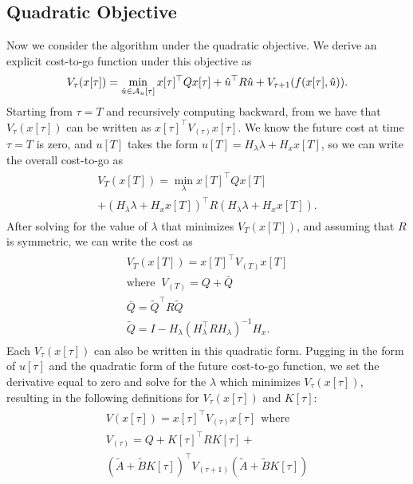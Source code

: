 \subsection{Quadratic Objective}
Now we consider the algorithm under the quadratic objective. We derive an explicit cost-to-go function under 
this objective as
\begin{align*}
V_{\tau}(x[\tau]) = \min\limits_{\hat{u} \in \mathcal{A}_u[\tau]} x[\tau]^\top  Q x[\tau] + \hat{u}^\top  R \hat{u} + V_{\tau+1}(f(x[\tau],\hat{u})).
\end{align*}
Starting from $\tau = T$ and recursively computing backward, from \cite{tseng2020system} we have that $V_{\tau}(x[\tau])$ can be written as $x[\tau]^\top  V_{(\tau)} x[\tau]$.
We know the future cost at time $\tau=T$ is zero, and $u[T]$ takes the form $u[T]=H_{\lambda}\lambda + H_x x[T]$, so we can write the overall cost-to-go as 
\begin{align*}
    \begin{gathered}
        V_{T}(x[T])
        = \min\limits_{\lambda} x[T]^\top  Q x[T] \\
        + (H_{\lambda}\lambda + H_x x[T])^\top  R (H_{\lambda}\lambda + H_x x[T]).
    \end{gathered}
\end{align*}
After solving for the value of $\lambda$ that minimizes $V_T(x[T])$, and assuming that $R$ is symmetric, we can write the cost as
\begin{align*}
    \begin{gathered}
        V_T(x[T]) = x[T]^\top  V_{(T)} x[T] \\
        \text{where }\ V_{(T)}= Q + \bar{Q} \\
        \bar{Q} = \tilde{Q}^\top  R \tilde{Q} \\
        \tilde{Q} = I-H_{\lambda}(H_{\lambda}^\top RH_{\lambda})^{-1}H_x.
    \end{gathered}
\end{align*}
Each $V_{\tau}(x[\tau])$ can also be written in this quadratic form. Pugging in the form of $u[\tau]$ and the 
quadratic form of the future cost-to-go function, we set the derivative equal to zero and solve for 
the $\lambda$ which minimizes $V_\tau(x[\tau])$, resulting in the following definitions for 
$V_{\tau}(x[\tau])$ and $K[\tau]$:
\begin{align}\label{eqn:V_LQ}
    \begin{gathered}
        V(x[\tau]) = x[\tau]^\top  V_{(\tau)} x[\tau]\ \ \text{where }\\
        V_{(\tau)} = Q + K[\tau]^\top  R K[\tau] + \\
        (\tilde{A}+\tilde{B}K[\tau])^\top  V_{(\tau+1)}(\tilde{A}+\tilde{B}K[\tau])
    \end{gathered}
\end{align}
